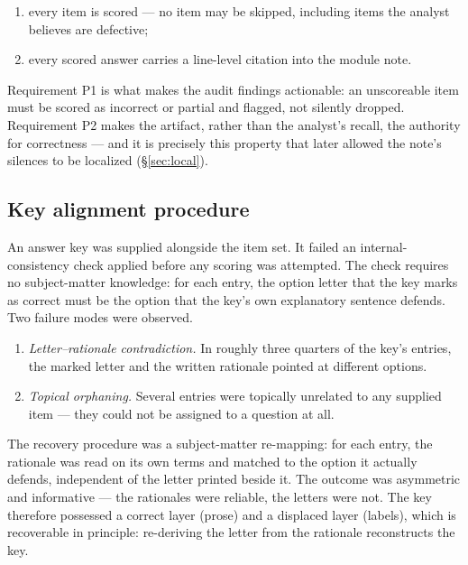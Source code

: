 \documentclass[11pt]{article}
\begin{document}
\begin{enumerate}[label=\textbf{P\arabic*.}]
\item every item is scored --- no item may be skipped, including items the
      analyst believes are defective;
\item every scored answer carries a line-level citation into the module note.
\end{enumerate}

Requirement P1 is what makes the audit findings actionable: an unscoreable
item must be scored as incorrect or partial and flagged, not silently
dropped. Requirement P2 makes the artifact, rather than the analyst's
recall, the authority for correctness --- and it is precisely this property
that later allowed the note's silences to be localized (\S\ref{sec:local}).

\subsection{Key alignment procedure}
\label{sec:alignment}

An answer key was supplied alongside the item set. It failed an
internal-consistency check applied before any scoring was attempted. The
check requires no subject-matter knowledge: for each entry, the option letter
that the key marks as correct must be the option that the key's own
explanatory sentence defends. Two failure modes were observed.

\begin{enumerate}[label=\textbf{F\arabic*.}]
\item \emph{Letter--rationale contradiction.} In roughly three quarters of
      the key's entries, the marked letter and the written rationale
      pointed at different options.
\item \emph{Topical orphaning.} Several entries were topically unrelated to
      any supplied item --- they could not be assigned to a question at all.
\end{enumerate}


The recovery procedure was a subject-matter re-mapping: for each entry, the
rationale was read on its own terms and matched to the option it actually
defends, independent of the letter printed beside it. The outcome was
asymmetric and informative --- the rationales were reliable, the letters
were not. The key therefore possessed a correct layer (prose) and a
displaced layer (labels), which is recoverable in principle: re-deriving the
letter from the rationale reconstructs the key.
\end{document}
